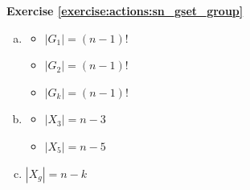 \noindent\textbf{Exercise \ref{exercise:actions:sn_gset_group}}
\begin{enumerate}[(a)]
\item
	\begin{itemize}
	\item
	$|G_1| = (n - 1)!$
	
	\item
	$|G_2| = (n - 1)!$
	
	\item
	$|G_k| = (n - 1)!$
	\end{itemize}
	
\item
	\begin{itemize}
	\item
	$|X_3| = n - 3$
	
	\item
	$|X_5| = n - 5$
	\end{itemize}
	
\item

$|X_g| = n - k$

\end{enumerate}

